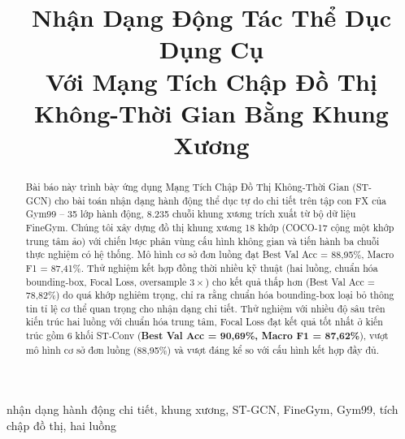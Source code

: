 \documentclass[conference]{IEEEtran}
\begin{document}
\title{Nhận Dạng Động Tác Thể Dục Dụng Cụ\\
Với Mạng Tích Chập Đồ Thị Không-Thời Gian Bằng Khung Xương}

\author{
  \and
}

\maketitle

\renewcommand{\thetable}{\arabic{table}}

\begin{abstract}
Bài báo này trình bày ứng dụng Mạng Tích Chập Đồ Thị Không-Thời Gian
(ST-GCN) cho bài toán nhận dạng hành động thể dục tự do chi tiết trên
tập con FX của Gym99 -- 35 lớp hành động, 8.235 chuỗi khung xương trích
xuất từ bộ dữ liệu FineGym. Chúng tôi xây dựng đồ thị khung xương 18
khớp (COCO-17 cộng một khớp trung tâm ảo) với chiến lược phân vùng cấu
hình không gian và tiến hành ba chuỗi thực nghiệm có hệ thống. Mô hình
cơ sở đơn luồng đạt Best Val Acc = 88,95\%, Macro F1 = 87,41\%. Thử
nghiệm kết hợp đồng thời nhiều kỹ thuật (hai luồng, chuẩn hóa
bounding-box, Focal Loss, oversample $3\times$) cho kết quả thấp hơn
(Best Val Acc = 78,82\%) do quá khớp nghiêm trọng, chỉ ra rằng chuẩn
hóa bounding-box loại bỏ thông tin tỉ lệ cơ thể quan trọng cho nhận
dạng chi tiết. Thử nghiệm với nhiều độ sâu trên kiến trúc hai luồng với chuẩn hóa
trung tâm, Focal Loss đạt kết quả tốt nhất ở kiến trúc gồm 6 khối ST-Conv
(\textbf{Best Val Acc = 90,69\%, Macro F1 = 87,62\%}), vượt mô hình cơ
sở đơn luồng (88,95\%) và vượt đáng kể so với cấu hình kết hợp đầy đủ.
\end{abstract}

\begin{IEEEkeywords}
nhận dạng hành động chi tiết, khung xương, ST-GCN, FineGym, Gym99,
tích chập đồ thị, hai luồng
\end{IEEEkeywords}
\end{document}
